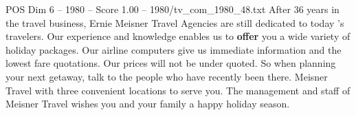 \begin{textsample}{POS Dim 6 – 1980 – Score 1.00 – 1980/tv\_com\_1980\_48.txt}  \label{ex:f6_pos_055}
After 36 years in the travel business, Ernie Meisner Travel Agencies are still dedicated to today 's travelers.
Our experience and knowledge enables us to \textbf{offer} you a wide variety of holiday packages.
Our airline computers give us immediate information and the lowest fare quotations.
Our prices will not be under quoted.
So when planning your next getaway, talk to the people who have recently been there.
Meisner Travel with three convenient locations to serve you.
The management and staff of Meisner Travel wishes you and your family a happy holiday season.

\end{textsample}
